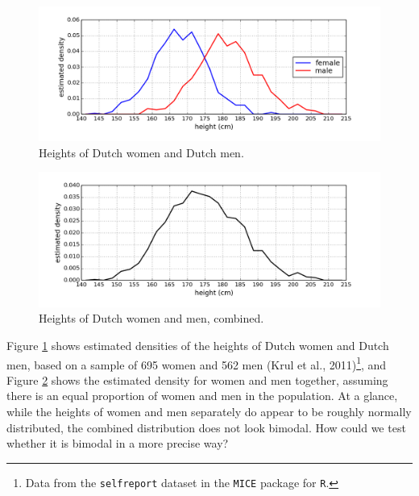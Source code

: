 \documentclass[12pt]{article}
\begin{document}
\begin{figure}
  \begin{center}
    \includegraphics[width=1\textwidth]{heights-female-male.png}
  \end{center}
  \caption{Heights of Dutch women and Dutch men.}
  \label{figure:heights}
\end{figure}

\begin{figure}
  \begin{center}
    \includegraphics[width=1\textwidth]{heights-combined.png}
  \end{center}
  \caption{Heights of Dutch women and men, combined.}
  \label{figure:heights-combined}
\end{figure}

Figure \ref{figure:heights} shows estimated densities of the heights of Dutch women and Dutch men, based on a sample of 695 women and 562 men (Krul et al., 2011)\footnote{Data from the {\tt selfreport} dataset in the {\tt MICE} package for {\tt R}.}, and Figure \ref{figure:heights-combined} shows the estimated density for women and men together, assuming there is an equal proportion of women and men in the population.   At a glance, while the heights of women and men separately do appear to be roughly normally distributed, the combined distribution does not look bimodal.  How could we test whether it is bimodal in a more precise way?
\end{document}
